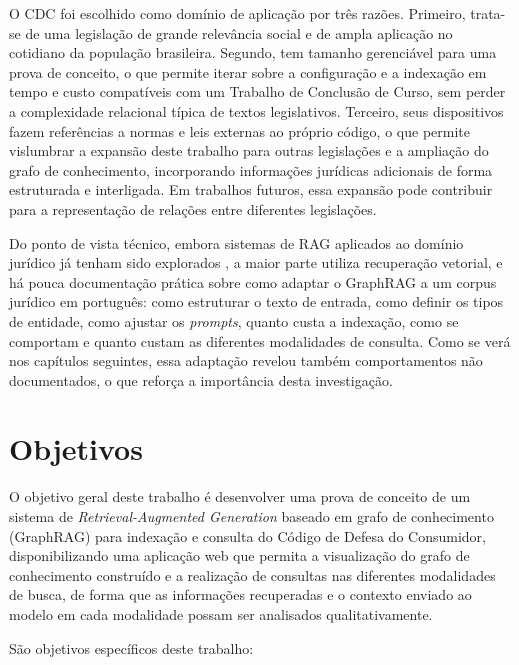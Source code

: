 O CDC foi escolhido como domínio de aplicação por três razões. Primeiro, trata-se de uma legislação de grande relevância social e de ampla aplicação no cotidiano da população brasileira. Segundo, tem tamanho gerenciável para uma prova de conceito, o que permite iterar sobre a configuração e a indexação em tempo e custo compatíveis com um Trabalho de Conclusão de Curso, sem perder a complexidade relacional típica de textos legislativos. Terceiro, seus dispositivos fazem referências a normas e leis externas ao próprio código, o que permite vislumbrar a expansão deste trabalho para outras legislações e a ampliação do grafo de conhecimento, incorporando informações jurídicas adicionais de forma estruturada e interligada. Em trabalhos futuros, essa expansão pode contribuir para a representação de relações entre diferentes legislações.

Do ponto de vista técnico, embora sistemas de RAG aplicados ao domínio jurídico já tenham sido explorados \cite{cui2023chatlaw, magesh2024hallucination, lima2024multilayered, lima2025polyvector}, a maior parte utiliza recuperação vetorial, e há pouca documentação prática sobre como adaptar o GraphRAG a um corpus jurídico em português: como estruturar o texto de entrada, como definir os tipos de entidade, como ajustar os \textit{prompts}, quanto custa a indexação, como se comportam e quanto custam as diferentes modalidades de consulta. Como se verá nos capítulos seguintes, essa adaptação revelou também comportamentos não documentados, o que reforça a importância desta investigação.

\section{Objetivos}
\label{sec-intro-obj}

O objetivo geral deste trabalho é desenvolver uma prova de conceito de um sistema de \textit{Retrieval-Augmented Generation} baseado em grafo de conhecimento (GraphRAG) para indexação e consulta do Código de Defesa do Consumidor, disponibilizando uma aplicação web que permita a visualização do grafo de conhecimento construído e a realização de consultas nas diferentes modalidades de busca, de forma que as informações recuperadas e o contexto enviado ao modelo em cada modalidade possam ser analisados qualitativamente.

São objetivos específicos deste trabalho:

